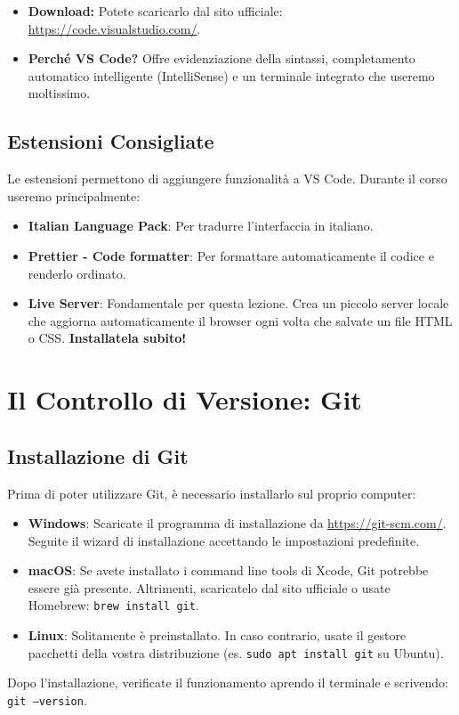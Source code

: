 \documentclass[11pt,a4paper]{report}
\begin{document}
\begin{itemize}
    \item \textbf{Download:} Potete scaricarlo dal sito ufficiale: \url{https://code.visualstudio.com/}.
    \item \textbf{Perché VS Code?} Offre evidenziazione della sintassi, completamento automatico intelligente (IntelliSense) e un terminale integrato che useremo moltissimo.
\end{itemize}

\subsection{Estensioni Consigliate}
Le estensioni permettono di aggiungere funzionalità a VS Code. Durante il corso useremo principalmente:
\begin{itemize}
    \item \textbf{Italian Language Pack}: Per tradurre l'interfaccia in italiano.
    \item \textbf{Prettier - Code formatter}: Per formattare automaticamente il codice e renderlo ordinato.
    \item \textbf{Live Server}: Fondamentale per questa lezione. Crea un piccolo server locale che aggiorna automaticamente il browser ogni volta che salvate un file HTML o CSS. \textbf{Installatela subito!}
\end{itemize}

\section{Il Controllo di Versione: Git}

\subsection{Installazione di Git}
Prima di poter utilizzare Git, è necessario installarlo sul proprio computer:
\begin{itemize}
    \item \textbf{Windows}: Scaricate il programma di installazione da \url{https://git-scm.com/}. Seguite il wizard di installazione accettando le impostazioni predefinite.
    \item \textbf{macOS}: Se avete installato i command line tools di Xcode, Git potrebbe essere già presente. Altrimenti, scaricatelo dal sito ufficiale o usate Homebrew: \texttt{brew install git}.
    \item \textbf{Linux}: Solitamente è preinstallato. In caso contrario, usate il gestore pacchetti della vostra distribuzione (es. \texttt{sudo apt install git} su Ubuntu).
\end{itemize}
Dopo l'installazione, verificate il funzionamento aprendo il terminale e scrivendo: \texttt{git --version}.
\end{document}
